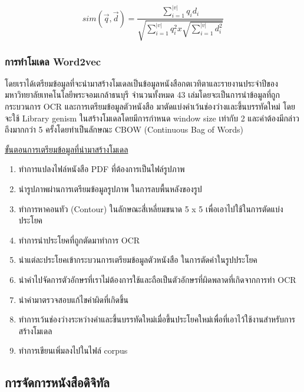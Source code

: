 \begin{equation}
    sim(\vec{q},\vec{d})=\frac{\sum_{i=1}^{|v|}q_{i}d_{i} }{\sqrt{\sum_{i=1}^{|v|}q^{2}_{i}x\sqrt{\sum_{i=1}^{|v|}d^{2}_{i}}}}
    \end{equation}    

\subsubsection{การทำโมเดล Word2vec}

โดยเราได้เตรียมข้อมูลที่จะนำมาสร้างโมเดลเป็นข้อมูลหนังสือกตเวทิตาและรายงานประจำปีของมหาวิทยาลัยเทคโนโลยีพระจอมเกล้าธนบุรี จำนวนทั้งหมด 43 เล่มโดยจะเป็นการนำข้อมูลที่ถูกกระบวนการ OCR และการเตรียมข้อมูลตัวหนังสือ มาตัดแบ่งคำเว้นช่องว่างและขึ้นบรรทัดใหม่ โดยจะใช้ Library genism ในสร้างโมเดลโดยมีการกำหนด window size เท่ากับ 2 และคำต้องมีกล่าวถึงมากกว่า 5 ครั้งโดยทำเป็นลักษณะ CBOW (Continuous Bag of Words)

\underline{ขั้นตอนการเตรียมข้อมูลที่นำมาสร้างโมเดล}

\begin{enumerate}
    \item ทำการแปลงไฟล์หนังสือ PDF ที่ต้องการเป็นไฟล์รูปภาพ
    \item นำรูปภาพผ่านการเตรียมข้อมูลรูปภาพ ในการลบพื้นหลังของรูป
    \item ทำการหาคอนทัว (Contour) ในลักษณะสี่เหลี่ยมขนาด 5 x 5 เพื่อเอาไปใช้ในการตัดแบ่งประโยค
    \item ทำการนำประโยคที่ถูกตัดมาทำการ OCR 
    \item นำแต่ละประโยคเข้ากระบวนการเตรียมข้อมูลตัวหนังสือ ในการตัดคำในรูปประโยค
    \item นำคำไปจัดการตัวอักษรที่เราไม่ต้องการใช้และถือเป็นตัวอักษรที่ผิดพลาดที่เกิดจากการทำ OCR
    \item นำคำมาตรวจสอบแก้ไขคำผิดที่เกิดขึ้น
    \item ทำการเว้นช่องว่างระหว่างคำและขึ้นบรรทัดใหม่เมื่อขึ้นประโยคใหม่เพื่อที่เอาไว้ใช้งานสำหรับการสร้างโมเดล
    \item ทำการเขียนเพิ่มลงไปในไฟล์ corpus 
\end{enumerate}



\subsection{การจัดการหนังสือดิจิทัล}

